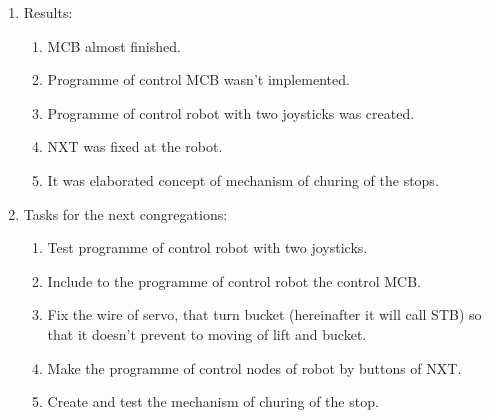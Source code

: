\begin{enumerate}
\begin{enumerate}
	\end{enumerate}
	
	\item Results:  
	\begin{enumerate}
		\item MCB almost finished.
		
		\item Programme of control MCB wasn't implemented.
		
		\item Programme of control robot with two joysticks was created.
		
		\item NXT was fixed at the robot.
		
		\item It was elaborated concept of mechanism of churing of the stops.
		
	\end{enumerate}
	
	\item Tasks for the next congregations:
	\begin{enumerate}
		\item Test programme of control robot with two joysticks.
		
		\item Include to the programme of control robot  the control MCB.
		
		\item Fix the wire of servo, that turn bucket (hereinafter it will call STB) so that it doesn't prevent to moving of lift and bucket.
		
		\item Make the programme of control nodes of robot by buttons of NXT.
		
		\item Create and test the mechanism of churing of the stop.
		
	\end{enumerate}     
\end{enumerate}
\fillpage

